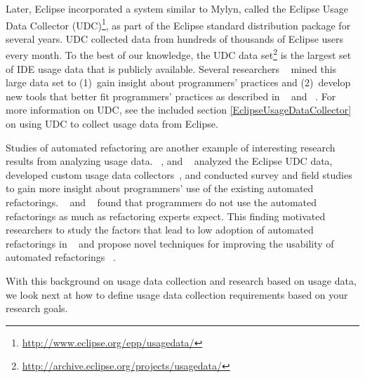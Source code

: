 %
Later, Eclipse incorporated a system similar to Mylyn, called the Eclipse Usage
Data Collector (UDC)\footnote{\url{http://www.eclipse.org/epp/usagedata/}}, as part of the Eclipse standard
distribution package for several years. UDC collected data from hundreds of
thousands of Eclipse users every month. To the best of our knowledge, the UDC
data set\footnote{\url{http://archive.eclipse.org/projects/usagedata/}} is the largest set of IDE usage data that is publicly
available. Several researchers  ~ mined this large
data set to
%
(1)~gain insight about programmers'
practices and
%
(2)~develop new tools that better fit programmers'
practices as described in ~\cite{MurphyHill2012Improving} and ~\cite{VakilianETAL2013Compositional}.
For more information on UDC, see the included section \ref {EclipseUsageDataCollector} on using UDC to collect usage data from Eclipse.

Studies of automated refactoring are another example of interesting research results from analyzing usage data. ~, and ~ analyzed the Eclipse UDC
data, developed
custom usage data collectors~\cite{VakilianETAL2012UseDisuseMisuse}, and
conducted survey and field studies~ to gain more
insight about programmers' use of the existing automated refactorings. ~ and
~
 found that programmers do not use the automated refactorings as
much as refactoring experts expect. This finding motivated researchers to study
the factors that lead to low adoption of automated
refactorings in ~\cite{VakilianETAL2012UseDisuseMisuse,V:MurphyHill2012How} and
propose novel techniques for improving the usability of automated
refactorings
~.

\vspace{0.1in}

With this background on usage data collection and research based on usage data, we look next at how to define usage data collection requirements based on your research goals.

